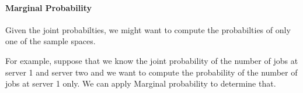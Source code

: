 \paragraph{Marginal Probability} Given the joint probabilties, we might want to
compute the probabilties of only one of the sample spaces. 

For example, suppose that we know the joint probability of the number of jobs at
server 1 and server two and we want to compute the probability of the number of
jobs at server 1 only. We can apply Marginal probability to determine that.

\begin{equation*} \begin{split}
\end{split} \end{equation*}



